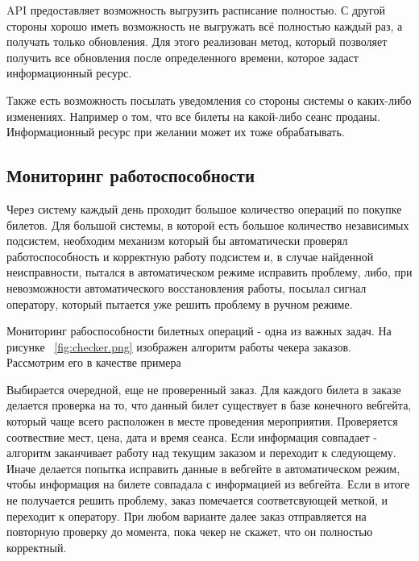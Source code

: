 API предоставляет возможность выгрузить расписание полностью. С другой стороны хорошо иметь возможность не выгружать всё полностью каждый раз, а получать только обновления. Для этого реализован метод, который позволяет получить все обновления после определенного времени, которое задаст информационный ресурс.

Также есть возможность посылать уведомления со стороны системы о каких-либо изменениях. Например о том, что все билеты на какой-либо сеанс проданы. Информационный ресурс при желании может их тоже обрабатывать.

\subsection{Мониторинг работоспособности}

Через систему каждый день проходит большое количество операций по покупке билетов. Для большой системы, в которой есть большое количество независимых подсистем, необходим механизм который бы автоматически проверял работоспособность и корректную работу подсистем и, в случае найденной неисправности, пытался в автоматическом режиме исправить проблему, либо, при невозможности автоматического восстановления работы, посылал сигнал оператору, который пытается уже решить проблему в ручном режиме.

Мониторинг рабоспособности билетных операций - одна из важных задач. На рисунке ~\ref{fig:checker.png} изображен алгоритм работы чекера заказов. Рассмотрим его в качестве примера

Выбирается очередной, еще не проверенный заказ. Для каждого билета в заказе делается проверка на то, что данный билет существует в базе конечного вебгейта, который чаще всего расположен в месте проведения мероприятия. Проверяется соотвествие мест, цена, дата и время сеанса. Если информация совпадает - алгоритм заканчивает работу над текущим заказом и переходит к следующему. Иначе делается попытка исправить данные в вебгейте в автоматическом режим, чтобы информация на билете совпадала с информацией из вебгейта. Если в итоге не получается решить проблему, заказ помечается соответсвующей меткой, и переходит к оператору. При любом варианте далее заказ отправляется на повторную проверку до момента, пока чекер не скажет, что он полностью корректный.

